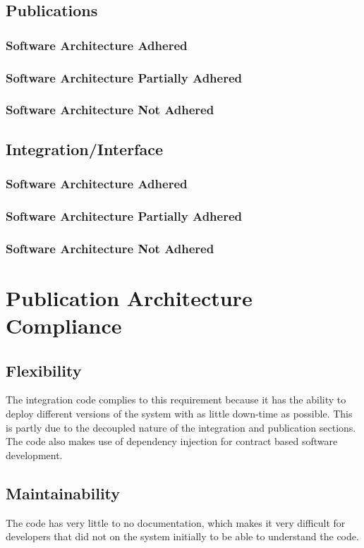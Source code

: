 \documentclass{article}
\begin{document}
	\subsection{Publications}
		\subsubsection{Software Architecture Adhered}
		\subsubsection{Software Architecture Partially Adhered}
		\subsubsection{Software Architecture Not Adhered}		
		
	\subsection{Integration/Interface}
		\subsubsection{Software Architecture Adhered}
		\subsubsection{Software Architecture Partially Adhered}
		\subsubsection{Software Architecture Not Adhered}		
		
\section{Publication Architecture Compliance}
    \subsection{Flexibility}
    The integration code complies to this requirement because it has the ability to deploy different versions of the system with as little down-time as possible. This is partly due to the decoupled nature of the integration and publication sections. The code also makes use of dependency injection for contract based software development.
    
    \subsection{Maintainability}
    The code has very little to no documentation, which makes it very difficult for developers that did not on the system initially to be able to understand the code.
    
\end{document}
